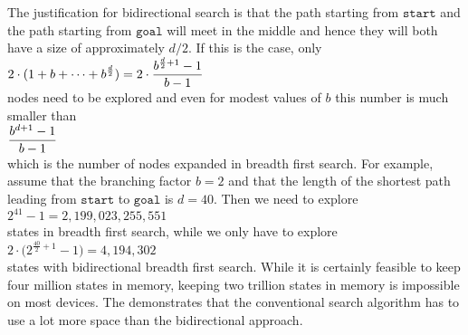 The justification for bidirectional search is that the path starting from $\texttt{start}$ and the
path starting from $\texttt{goal}$ will meet in the middle and hence they will both have a size of approximately
$d/2$.  If this is the case, only
\\[0.2cm]
\hspace*{1.3cm}
$\displaystyle 2 \cdot ( 1 + b + \cdots + b^{\frac{d}{2}} ) = 2 \cdot \frac{b^{\frac{d}{2}+1} - 1}{b - 1}$
\\[0.2cm]
nodes need to be explored and even for modest values of $b$ this number is much smaller than
\\[0.2cm]
\hspace*{1.3cm}
$\displaystyle\frac{b^{d+1} - 1}{b - 1}$
\\[0.2cm]
which is the number of nodes expanded in breadth first search.  For example, assume that the branching factor
$b = 2$ and that the length of the shortest path leading from $\texttt{start}$ to $\texttt{goal}$
is $d = 40$.  Then we need to explore
\\[0.2cm]
\hspace*{1.3cm}
$2^{41} - 1 = 2,199,023,255,551$
\\[0.2cm]
states in breadth first search, while we only have to explore
\\[0.2cm]
\hspace*{1.3cm}
$2 \cdot \bigl(2^{\frac{40}{2}+1} - 1\bigr) = 4,194,302 $
\\[0.2cm]
states with bidirectional breadth first search.  While it is certainly feasible to keep four million states in memory,
keeping two trillion states in memory is impossible on most devices.  The
 demonstrates that the conventional search algorithm has to use a lot
more space than the bidirectional approach. 

